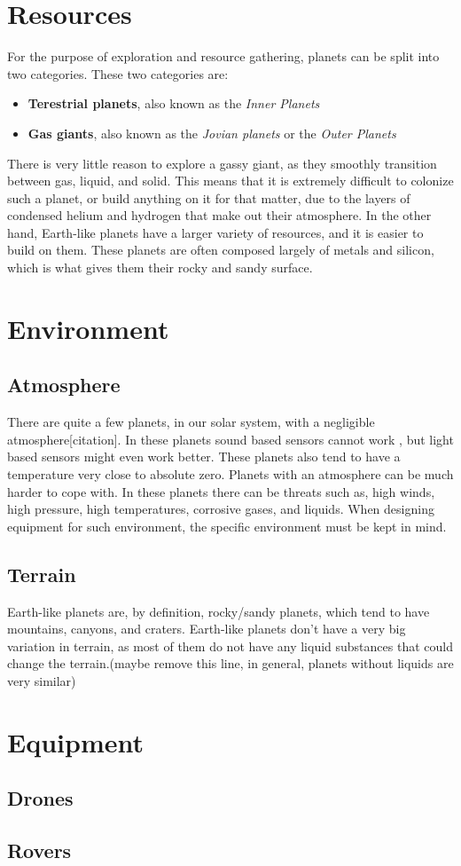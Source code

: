 \clearpage

\section{Resources}
For the purpose of exploration and resource gathering, planets can be split into two categories. These two categories are:\cite{planettypes}
\begin{itemize}
	\item{\textbf{Terestrial planets}, also known as the \textit{Inner Planets}}
	\item{\textbf{Gas giants}, also known as the \textit{Jovian planets} or the \textit{Outer Planets}}
\end{itemize}

There is very little reason to explore a gassy giant, as they smoothly transition between gas, liquid, and solid. This means that it is extremely difficult to colonize such a planet, or build anything on it for that matter, due to the layers of condensed helium and hydrogen that make out their atmosphere\cite{outerplanetatmosphere}.
In the other hand, Earth-like planets have a larger variety of resources, and it is easier to build on them. These planets are often composed largely of metals and silicon, which is what gives them their rocky and sandy surface.

\section{Environment}
\subsection{Atmosphere}
There are quite a few planets, in our solar system, with a negligible atmosphere[citation]. In these planets sound based sensors cannot work
, but light based sensors might even work better. These planets also tend to have a temperature very close to absolute zero\cite{planetstemp}.
Planets with an atmosphere can be much harder to cope with. In these planets there can be threats such as, high winds, high pressure, high temperatures, corrosive gases, and liquids. When designing equipment for such environment, the specific environment must be kept in mind.

\subsection{Terrain}
Earth-like planets are, by definition, rocky/sandy planets, which tend to have mountains, canyons, and craters.
Earth-like planets don't have a very big variation in terrain, as most of them do not have any liquid substances that could change the terrain.(maybe remove this line, in general, planets without liquids are very similar)

\section{Equipment}
\subsection{Drones}
\subsection{Rovers}
